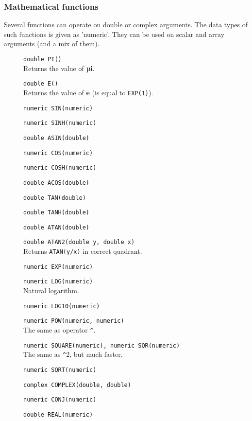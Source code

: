 \subsubsection{Mathematical functions}
Several functions can operate on double or complex arguments.
The data types of such functions is given as 'numeric'.
They can be used on scalar and array arguments (and a mix of them).
\begin{description}
  \item[] \texttt{double PI()}\\
    Returns the value of \textbf{pi}.
  \item[] \texttt{double E()}\\
    Returns the value of \textbf{e} (is equal to \texttt{EXP(1)}).
  \item[] \texttt{numeric SIN(numeric)}
  \item[] \texttt{numeric SINH(numeric)}
  \item[] \texttt{double ASIN(double)}
  \item[] \texttt{numeric COS(numeric)}
  \item[] \texttt{numeric COSH(numeric)}
  \item[] \texttt{double ACOS(double)}
  \item[] \texttt{double TAN(double)}
  \item[] \texttt{double TANH(double)}
  \item[] \texttt{double ATAN(double)}
  \item[] \texttt{double ATAN2(double y, double x)}\\
    Returns \texttt{ATAN(y/x)} in correct quadrant.
  \item[] \texttt{numeric EXP(numeric)}
  \item[] \texttt{numeric LOG(numeric)}\\
    Natural logarithm.
  \item[] \texttt{numeric LOG10(numeric)}
  \item[] \texttt{numeric POW(numeric, numeric)}\\
    The same as operator \verb+^+.
  \item[] \texttt{numeric SQUARE(numeric),  numeric SQR(numeric)}\\
    The same as \verb+^+2, but much faster.
  \item[] \texttt{numeric SQRT(numeric)}
  \item[] \texttt{complex COMPLEX(double, double)}
  \item[] \texttt{numeric CONJ(numeric)}
  \item[] \texttt{double REAL(numeric)}\\

\end{description}
